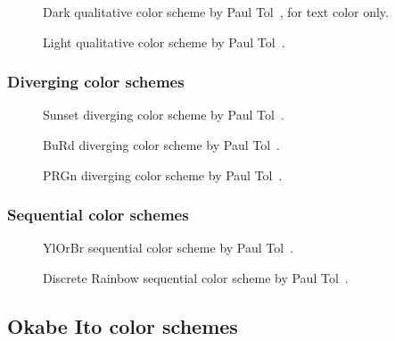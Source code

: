 \documentclass{scrartcl}
\begin{document}
\begin{figure}[ht]
    \centering
    \caption{Dark qualitative color scheme by Paul Tol~\cite{Tol}, for text color only.}
    \label{fig:T_Q_DT}
\end{figure}

\begin{figure}[ht]
    \centering
    \caption{Light qualitative color scheme by Paul Tol~\cite{Tol}.}
    \label{fig:T_Q_L}
\end{figure}

\subsubsection{Diverging color schemes}

\begin{figure}[ht]
    \centering
    \caption{Sunset diverging color scheme by Paul Tol~\cite{Tol}.}
    \label{fig:T_D_S}
\end{figure}

\begin{figure}[ht]
    \centering
    \caption{BuRd diverging color scheme by Paul Tol~\cite{Tol}.}
    \label{fig:T_D_BR}
\end{figure}

\begin{figure}[ht]
    \centering
    \caption{PRGn diverging color scheme by Paul Tol~\cite{Tol}.}
    \label{fig:T_D_PG}
\end{figure}

\subsubsection{Sequential color schemes}

\begin{figure}[ht]
    \centering
    \caption{YlOrBr sequential color scheme by Paul Tol~\cite{Tol}.}
    \label{fig:T_S_YB}
\end{figure}

\begin{figure}[ht]
    \centering
    \caption{Discrete Rainbow sequential color scheme by Paul Tol~\cite{Tol}.}
    \label{fig:T_S_DR}
\end{figure}

\subsection{Okabe Ito color schemes}
\end{document}
